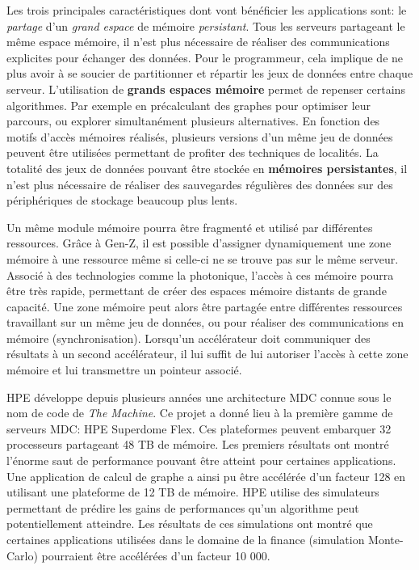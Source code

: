         Les trois principales caractéristiques dont vont bénéficier les applications sont: le \textit{partage} d'un \textit{grand espace} de mémoire \textit{persistant}. 
        Tous les serveurs partageant le même espace mémoire, il n'est plus nécessaire de réaliser des communications explicites pour échanger des données. Pour le programmeur, cela implique de ne plus avoir à se soucier de partitionner et répartir les jeux de données entre chaque serveur. 
        L'utilisation de \textbf{grands espaces mémoire} permet de repenser certains algorithmes. Par exemple en précalculant des graphes pour optimiser leur parcours, ou explorer simultanément plusieurs alternatives. En fonction des motifs d'accès mémoires réalisés, plusieurs versions d'un même jeu de données peuvent être utilisées permettant de profiter des techniques de localités.
        La totalité des jeux de données pouvant être stockée en \textbf{mémoires persistantes}, il n'est plus nécessaire de réaliser des sauvegardes régulières des données sur des périphériques de stockage beaucoup plus lents.

        Un même module mémoire pourra être fragmenté et utilisé par différentes ressources. Grâce à Gen-Z, il est possible d'assigner dynamiquement une zone mémoire à une ressource même si celle-ci ne se trouve pas sur le même serveur.  Associé à des technologies comme la photonique, l'accès à ces mémoire pourra être très rapide, permettant de créer des espaces mémoire distants de grande capacité. Une zone mémoire peut alors être partagée entre différentes ressources travaillant sur un même jeu de données, ou pour réaliser des communications en mémoire (synchronisation). Lorsqu'un accélérateur doit communiquer des résultats à un second accélérateur, il lui suffit de lui autoriser l'accès à cette zone mémoire et lui transmettre un pointeur associé.
           
         HPE développe depuis plusieurs années une architecture MDC connue sous le nom de code de \textit{The Machine}. Ce projet a donné lieu à la première gamme de serveurs MDC: HPE Superdome Flex. Ces plateformes peuvent embarquer 32 processeurs partageant 48 TB de mémoire. Les premiers résultats ont montré l'énorme saut de performance pouvant être atteint pour certaines applications. Une application de calcul de graphe \cite{Chen2016a} a ainsi pu être accélérée d'un facteur 128 en utilisant une plateforme de 12 TB de mémoire. HPE utilise des simulateurs permettant de prédire les gains de performances qu'un algorithme peut potentiellement atteindre. Les résultats de ces simulations ont montré que certaines applications utilisées dans le domaine de la finance (simulation Monte-Carlo) pourraient être accélérées d'un facteur 10 000.
   
